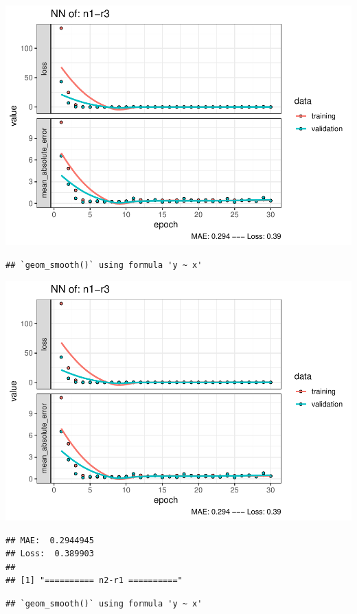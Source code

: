 \documentclass[
]{article}
\begin{document}
\includegraphics{project-code_files/figure-latex/unnamed-chunk-18-15.pdf}

\begin{verbatim}
## `geom_smooth()` using formula 'y ~ x'
\end{verbatim}

\includegraphics{project-code_files/figure-latex/unnamed-chunk-18-16.pdf}

\begin{verbatim}
## MAE:  0.2944945
## Loss:  0.389903 
## 
## [1] "========== n2-r1 =========="
\end{verbatim}

\begin{verbatim}
## `geom_smooth()` using formula 'y ~ x'
\end{verbatim}
\end{document}

